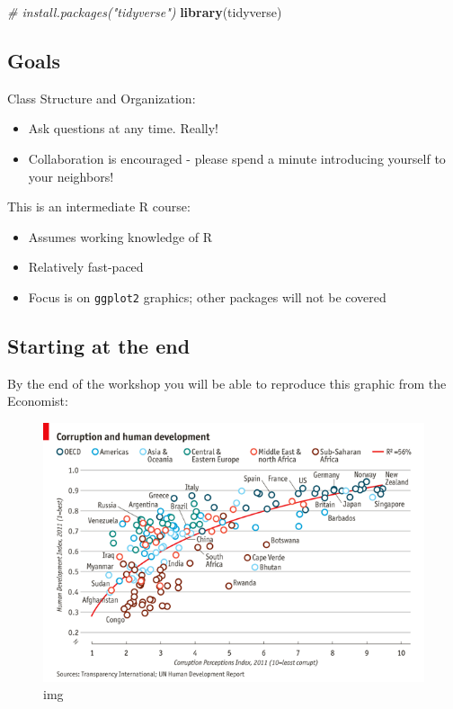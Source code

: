 \documentclass[]{book}
\newenvironment{Shaded}{\begin{snugshade}}{\end{snugshade}}
\newcommand{\KeywordTok}[1]{\textcolor[rgb]{0.13,0.29,0.53}{\textbf{#1}}}
\newcommand{\CommentTok}[1]{\textcolor[rgb]{0.56,0.35,0.01}{\textit{#1}}}
\newcommand{\NormalTok}[1]{#1}
\providecommand{\tightlist}{%
  \setlength{\itemsep}{0pt}\setlength{\parskip}{0pt}}
\begin{document}
\begin{Shaded}
\begin{Highlighting}[]
\CommentTok{# install.packages("tidyverse")}
\KeywordTok{library}\NormalTok{(tidyverse)}
\end{Highlighting}
\end{Shaded}

\subsection{Goals}\label{goals-2}

Class Structure and Organization:

\begin{itemize}
\tightlist
\item
  Ask questions at any time. Really!
\item
  Collaboration is encouraged - please spend a minute introducing
  yourself to your neighbors!
\end{itemize}

This is an intermediate R course:

\begin{itemize}
\tightlist
\item
  Assumes working knowledge of R
\item
  Relatively fast-paced
\item
  Focus is on \texttt{ggplot2} graphics; other packages will not be
  covered
\end{itemize}

\subsection{Starting at the end}\label{starting-at-the-end}

By the end of the workshop you will be able to reproduce this graphic
from the Economist:

\begin{figure}
\centering
\includegraphics{R/Rgraphics/images/Economist1.png}
\caption{img}
\end{figure}
\end{document}
